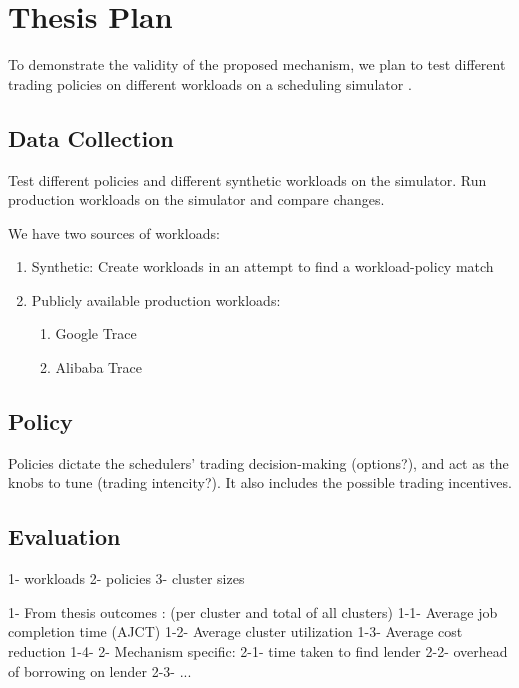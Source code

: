 \section{Thesis Plan}

To demonstrate the validity of the proposed mechanism, we plan to test different trading policies 
on different workloads on a scheduling simulator \cite{sched-github}.


\subsection{Data Collection}
Test different policies and different synthetic workloads on the simulator. 
Run production workloads on the simulator and compare changes.

We have two sources of workloads:
\begin{enumerate}
    \item Synthetic: Create workloads in an attempt to find a workload-policy match
    \item Publicly available production workloads:
        \begin{enumerate}
            \item Google Trace %
            \item Alibaba Trace %
        \end{enumerate}
\end{enumerate}

\subsection{Policy}
Policies dictate the schedulers' trading decision-making (options?), and 
act as the knobs to tune (trading intencity?). It also includes the possible trading incentives.

\subsection{Evaluation}
1- workloads %
2- policies 
3- cluster sizes

1- From thesis outcomes : (per cluster and total of all clusters)
    1-1- Average job completion time (AJCT)
    1-2- Average cluster utilization
    1-3- Average cost reduction
    1-4- 
2- Mechanism specific: 
   2-1- time taken to find lender
   2-2- overhead of borrowing on lender
   2-3- ... 
